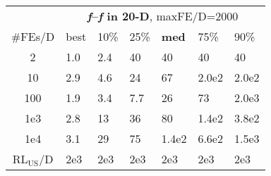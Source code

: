 \begin{tabular}{c|llllll}
 & \multicolumn{6}{|c}{\textbf{\textit{f}\raisebox{-0.35ex}{1}--\textit{f}\raisebox{-0.35ex}{24} in 20-D}, maxFE/D=2000}\\
\#FEs/D & best & 10\% & 25\% & \textbf{med} & 75\% & 90\%\\
2 & \hspace*{1ex}1.0 & \hspace*{1ex}2.4 & 40 & 40 & 40 & 40\\
10 & \hspace*{1ex}2.9 & \hspace*{1ex}4.6 & 24 & 67 & 2.0e2 & 2.0e2\\
100 & \hspace*{1ex}1.9 & \hspace*{1ex}3.4 & \hspace*{1ex}7.7 & 26 & 73 & 2.0e3\\
1e3 & \hspace*{1ex}2.8 & 13 & 36 & 80 & 1.4e2 & 3.8e2\\
1e4 & \hspace*{1ex}3.1 & 29 & 75 & 1.4e2 & 6.6e2 & 1.5e3\\
$\text{RL}_{\text{US}}$/D & 2e3 & 2e3 & 2e3 & 2e3 & 2e3 & 2e3
\end{tabular}
